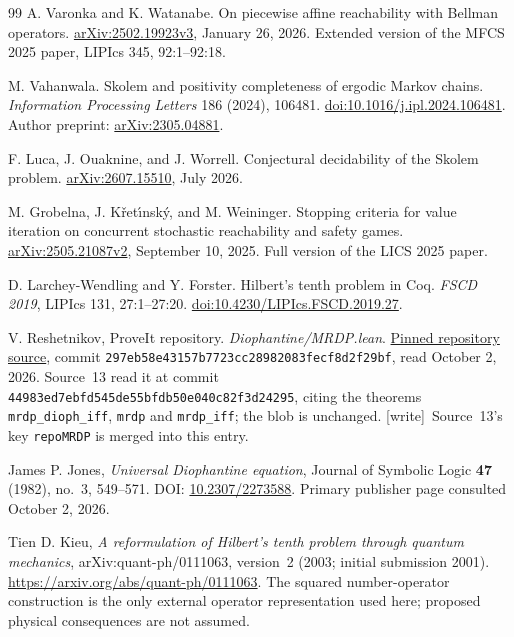 \documentclass[11pt,letterpaper]{article}
\theoremstyle{definition}
\theoremstyle{remark}
\newcommand{\wtag}{\textup{[write]}}
\begin{document}
\begin{thebibliography}{99}
A. Varonka and K. Watanabe.
On piecewise affine reachability with Bellman operators.
\href{https://arxiv.org/abs/2502.19923v3}{arXiv:2502.19923v3},
January 26, 2026. Extended version of the MFCS 2025 paper,
LIPIcs 345, 92:1--92:18.

M. Vahanwala.
Skolem and positivity completeness of ergodic Markov chains.
\emph{Information Processing Letters} 186 (2024), 106481.
\href{https://doi.org/10.1016/j.ipl.2024.106481}{doi:10.1016/j.ipl.2024.106481}.
Author preprint: \href{https://arxiv.org/abs/2305.04881}{arXiv:2305.04881}.

F. Luca, J. Ouaknine, and J. Worrell.
Conjectural decidability of the Skolem problem.
\href{https://arxiv.org/abs/2607.15510}{arXiv:2607.15510}, July 2026.

M. Grobelna, J. K\v{r}et\'{\i}nsk\'{y}, and M. Weininger.
Stopping criteria for value iteration on concurrent stochastic reachability
and safety games.
\href{https://arxiv.org/abs/2505.21087v2}{arXiv:2505.21087v2},
September 10, 2025. Full version of the LICS 2025 paper.

D. Larchey-Wendling and Y. Forster.
Hilbert's tenth problem in Coq.
\emph{FSCD 2019}, LIPIcs 131, 27:1--27:20.
\href{https://doi.org/10.4230/LIPIcs.FSCD.2019.27}{doi:10.4230/LIPIcs.FSCD.2019.27}.

V. Reshetnikov, ProveIt repository.
\emph{Diophantine/MRDP.lean}.
\href{https://github.com/VladimirReshetnikov/ProveIt/blob/297eb58e43157b7723cc28982083fecf8d2f29bf/Computability/HilbertTenthProblem/Lean/Diophantine/MRDP.lean}{Pinned repository source},
commit \texttt{297eb58e43157b7723cc28982083fecf8d2f29bf},
read October 2, 2026. Source~13 read it at commit \texttt{44983ed7ebfd545de55bfdb50e040c82f3d24295}, citing the theorems \texttt{mrdp\_dioph\_iff}, \texttt{mrdp} and \texttt{mrdp\_iff}; the blob is unchanged. \wtag\ Source~13's key \texttt{repoMRDP} is merged into this entry.

James P. Jones,
\emph{Universal Diophantine equation},
Journal of Symbolic Logic \textbf{47} (1982), no.~3, 549--571.
DOI: \href{https://doi.org/10.2307/2273588}{10.2307/2273588}.
Primary publisher page consulted October 2, 2026.

Tien D. Kieu,
\emph{A reformulation of Hilbert's tenth problem through quantum mechanics},
arXiv:quant-ph/0111063, version~2 (2003; initial submission 2001).
\url{https://arxiv.org/abs/quant-ph/0111063}.
The squared number-operator construction is the only external operator representation used here; proposed physical consequences are not assumed.


\end{thebibliography}
\end{document}
